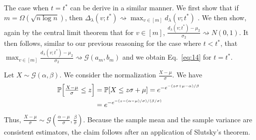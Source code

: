 \documentclass[final]{IEEEtran}
\theoremstyle{definition}
\begin{document}
\begin{IEEEproof}
The case when $t = t^{*}$ can be
derive in a similar manner. We first show that if $m =
\Omega(\sqrt{n \log{n}})$, then $\Delta_{\lambda}(v;t^{*}) \rightsquigarrow
\max_{v \in [m]}{d_{\lambda}(v;t^{*})}$ \cite[Lemma
3.1]{rukhin:_limit_distr_graph_scan_statis}.  
We then show, again by the 
central limit theorem that for $v \in [m]$, $\tfrac{d_{\lambda}(v;t^{*}) -
  \mu_2}{\sigma_2} \rightsquigarrow N(0,1)$. It then follows, similar
to our previous reasoning for the case where $t < t^{*}$, that
$\max_{v \in [m]} \tfrac{d_{\lambda}(v;t^{*}) -
  \mu_2}{\sigma_2} \rightsquigarrow \mathcal{G}(a_m,b_m)$ and we obtain
Eq.~\eqref{eq:14} for $t = t^{*}$.  
\end{IEEEproof}
\begin{IEEEproof}
  Let $ X \sim \mathcal{G}(\alpha, \beta)$. We consider the
  normalization $\tfrac{X - \mu}{\sigma}$. We have
  \begin{equation*}
    \begin{split}
    \mathbb{P}\Bigl[ \tfrac{X - \mu}{\sigma} \leq z\Bigr]  &= \mathbb{P}[X \leq z
    \sigma + \mu] 
    = e^{-e^{-(z \sigma + \mu - \alpha)/\beta}} \\
      &= e^{- e^{-(z - (\alpha - \mu)/\sigma)/(\beta/\sigma)}}
    \end{split}
  \end{equation*}
  Thus, $\tfrac{X - \mu}{\sigma} \sim \mathcal{G}(\tfrac{\alpha -
    \mu}{\sigma}, \tfrac{\beta}{\sigma})$. Because the sample
  mean and the sample variance are consistent estimators, the claim
  follows after an application of Slutsky's theorem.
\end{IEEEproof}
\end{document}
